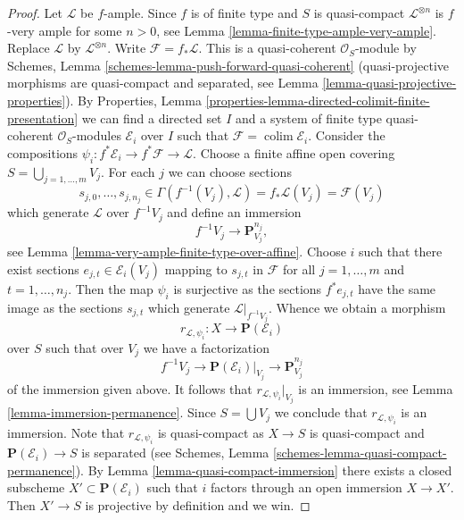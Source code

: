 \documentclass[10pt,a4paper]{amsart}
\theoremstyle{plain}
\theoremstyle{definition}
\theoremstyle{remark}
\numberwithin{equation}{subsection}
\def\colim{\mathop{\mathrm{colim}}\nolimits}
\begin{document}
\begin{proof}
Let $\mathcal{L}$ be $f$-ample. Since $f$ is of finite type and $S$ is
quasi-compact $\mathcal{L}^{\otimes n}$ is $f$-very ample for some $n > 0$, see
Lemma \ref{lemma-finite-type-ample-very-ample}.
Replace $\mathcal{L}$ by $\mathcal{L}^{\otimes n}$.
Write $\mathcal{F} = f_*\mathcal{L}$. This is a quasi-coherent
$\mathcal{O}_S$-module by 
Schemes, Lemma \ref{schemes-lemma-push-forward-quasi-coherent}
(quasi-projective morphisms are quasi-compact and
separated, see Lemma \ref{lemma-quasi-projective-properties}). By
Properties, Lemma \ref{properties-lemma-directed-colimit-finite-presentation}
we can find a directed set $I$ and a system of
finite type quasi-coherent $\mathcal{O}_S$-modules $\mathcal{E}_i$
over $I$ such that $\mathcal{F} = \colim \mathcal{E}_i$.
Consider the compositions
$\psi_i : f^*\mathcal{E}_i \to f^*\mathcal{F} \to \mathcal{L}$.
Choose a finite affine open covering $S = \bigcup_{j = 1, \ldots, m} V_j$.
For each $j$ we can choose sections
$$
s_{j, 0}, \ldots, s_{j, n_j} \in
\Gamma(f^{-1}(V_j), \mathcal{L}) = f_*\mathcal{L}(V_j) = \mathcal{F}(V_j)
$$
which generate $\mathcal{L}$ over $f^{-1}V_j$ and define an immersion
$$
f^{-1}V_j \longrightarrow \mathbf{P}^{n_j}_{V_j},
$$
see Lemma \ref{lemma-very-ample-finite-type-over-affine}.
Choose $i$ such that there exist sections $e_{j, t} \in \mathcal{E}_i(V_j)$
mapping to $s_{j, t}$ in $\mathcal{F}$ for all $j = 1, \ldots, m$ and
$t = 1, \ldots, n_j$. Then the map $\psi_i$ is surjective
as the sections $f^*e_{j, t}$ have the same image as the sections $s_{j, t}$
which generate $\mathcal{L}|_{f^{-1}V_j}$. Whence we obtain a morphism
$$
r_{\mathcal{L}, \psi_i} : X \longrightarrow \mathbf{P}(\mathcal{E}_i)
$$
over $S$ such that over $V_j$ we have a factorization
$$
f^{-1}V_j \to \mathbf{P}(\mathcal{E}_i)|_{V_j} \to \mathbf{P}^{n_j}_{V_j}
$$
of the immersion given above. It follows that $r_{\mathcal{L}, \psi_i}|_{V_j}$
is an immersion, see Lemma \ref{lemma-immersion-permanence}.
Since $S = \bigcup V_j$ we conclude that $r_{\mathcal{L}, \psi_i}$
is an immersion.
Note that $r_{\mathcal{L}, \psi_i}$ is quasi-compact as
$X \to S$ is quasi-compact and $\mathbf{P}(\mathcal{E}_i) \to S$ is separated
(see Schemes, Lemma \ref{schemes-lemma-quasi-compact-permanence}).
By Lemma \ref{lemma-quasi-compact-immersion} there exists a closed
subscheme $X' \subset \mathbf{P}(\mathcal{E}_i)$ such that $i$ factors
through an open immersion $X \to X'$. Then $X' \to S$ is projective
by definition and we win.
\end{proof}
\end{document}
